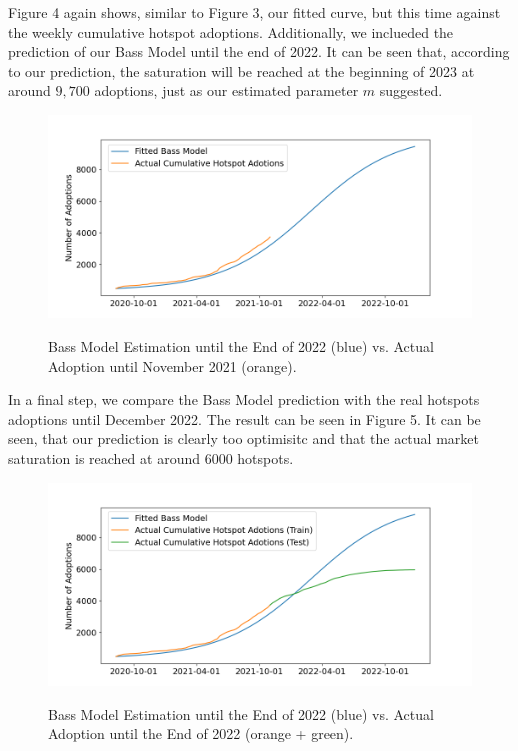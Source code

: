 \documentclass{article}
\begin{document}
\noindent Figure 4 again shows, similar to Figure 3, our fitted curve, but this time against the weekly cumulative hotspot adoptions. Additionally, we inclueded the prediction
of our Bass Model until the end of 2022. It can be seen that, according to our prediction, the saturation will be reached at the beginning of 2023 at around $9,700$ adoptions,
just as our estimated parameter $m$ suggested.

\bigskip
\bigskip
\bigskip
\bigskip

\begin{figure}[!hptb]
    \centering{}\includegraphics[scale=0.6]{plots/cumulative_bass_model_adoptions_vs_actual_cumulative_adoptions.png}\\
    \caption{Bass Model Estimation until the End of 2022 (blue) vs. Actual Adoption until November 2021 (orange).}
\end{figure}

\noindent In a final step, we compare the Bass Model prediction with the real hotspots adoptions until December 2022. The result can be seen in Figure 5. It can be seen, that our
prediction is clearly too optimisitc and that the actual market saturation is reached at around $6000$ hotspots.

\begin{figure}[!hptb]
    \centering{}\includegraphics[scale=0.6]{plots/predicted_cumulative_weekly_hotspot_adoptions.png}\\
    \caption{Bass Model Estimation until the End of 2022 (blue) vs. Actual Adoption until the End of 2022 (orange + green).}
\end{figure}
\end{document}
